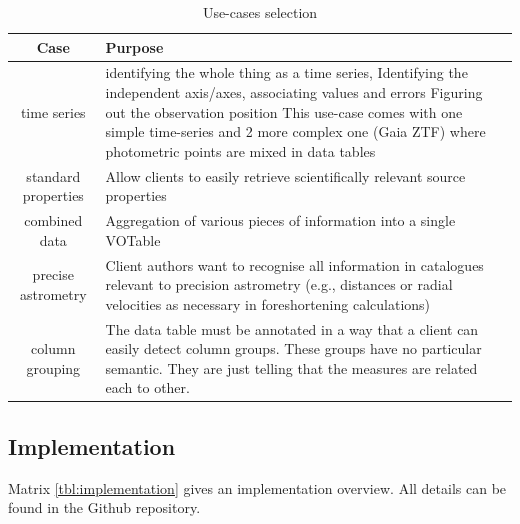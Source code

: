 \documentclass[11pt,a4paper]{ivoa}
\begin{document}
\begin{table}[!htbp]
\small
\centering
\begin{tabulary}{\linewidth}{|c|J|}       
       \hline 
            \textbf{Case} & 
            \textbf {Purpose}\\
       \hline         \hline  
            time series & identifying the whole thing as a time series, 
                                  \newline  Identifying the independent axis/axes, associating values and errors 
                                  \newline Figuring out the observation position  
                                  \newline This use-case comes with one simple time-series  and 2 more complex one (Gaia ZTF) where photometric points are mixed in data tables\\
       \hline 
            standard properties  & 
            Allow clients to easily retrieve  scientifically relevant source properties \\
       \hline 
            combined data & 
            Aggregation of various pieces of information into a single VOTable \\
       \hline 
            precise astrometry & 
            Client authors want to recognise all information in catalogues relevant to precision astrometry 
            \newline(e.g., distances or radial velocities as necessary in foreshortening calculations) \\
        \hline 
            column grouping & 
            The data table must be annotated in a way that a client can easily detect column groups. 
            \newline These groups have no particular semantic. They are just telling that the measures are related each to other.\\
      \hline 
     \end{tabulary}
     \caption{Use-cases selection} 
     \label{tbl:use-case}
 \end{table}

\subsection{Implementation}

Matrix \ref{tbl:implementation} gives an implementation overview. All details can be found in the Github repository.
\end{document}
